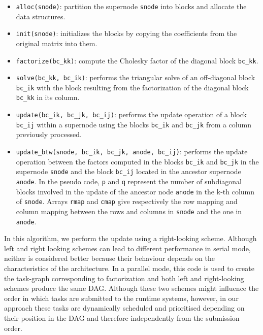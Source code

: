 \documentclass{article}
\begin{document}
\begin{itemize}
\item \texttt{alloc(snode)}: partition the supernode \texttt{snode}
  into blocks and allocate the data structures.
\item \texttt{init(snode)}: initializes the blocks by copying the
  coefficients from the original matrix into them.
\item \texttt{factorize(bc\_kk)}: compute the Cholesky factor of the
  diagonal block \texttt{bc\_kk}.
\item \texttt{solve(bc\_kk, bc\_ik)}: performs the triangular solve of
  an off-diagonal block \texttt{bc\_ik} with the block resulting from
  the factorization of the diagonal block \texttt{bc\_kk} in its
  column.
\item \texttt{update(bc\_ik, bc\_jk, bc\_ij)}: performs the update
  operation of a block \texttt{bc\_ij} within a supernode using the
  blocks \texttt{bc\_ik} and \texttt{bc\_jk} from a column previously
  processed.
\item \texttt{update\_btw(snode, bc\_ik, bc\_jk, anode, bc\_ij)}:
  performs the update operation between the factors computed in the
  blocks \texttt{bc\_ik} and \texttt{bc\_jk} in the supernode
  \texttt{snode} and the block \texttt{bc\_ij} located in the ancestor
  supernode \texttt{anode}. In the pseudo code, \texttt{p} and
  \texttt{q} represent the number of subdiagonal blocks involved in
  the update of the ancestor node \texttt{anode} in the k-th column of
  \texttt{snode}. Arrays \texttt{rmap} and \texttt{cmap} give
  respectively the row mapping and column mapping between the rows and
  columns in \texttt{snode} and the one in \texttt{anode}. 
\end{itemize}

In this algorithm, we perform the update using a right-looking
scheme. Although left and right looking schemes can lead to different
performance in serial mode, neither is considered better because their
behaviour depends on the characteristics of the architecture. In a
parallel mode, this code is used to create the task-graph
corresponding to factorization and both left and right-looking schemes
produce the same DAG. Although these two schemes might influence the
order in which tasks are submitted to the runtime systems, however, in
our approach these tasks are dynamically scheduled and prioritised
depending on their position in the DAG and therefore independently
from the submission order.
\end{document}
